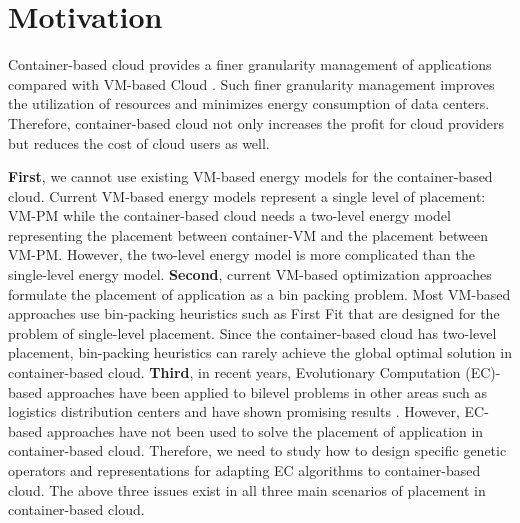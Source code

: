 \newpage

\section{Motivation}
\label{sec:motivation}

 Container-based cloud provides a finer granularity management of applications compared with VM-based Cloud \cite{:2017ff}. Such finer granularity management improves the utilization of resources and minimizes energy consumption of data centers. Therefore, container-based cloud not only increases the profit for cloud providers but reduces the cost of cloud users as well.

 \textbf{First}, we cannot use existing VM-based energy models for the container-based cloud. Current VM-based energy models represent a single level of placement: VM-PM while the container-based cloud needs a two-level energy model representing the placement between container-VM and the placement between VM-PM. However, the two-level energy model is more complicated than the single-level energy model. 
\textbf{Second}, current VM-based optimization approaches \cite{Beloglazov:2010dt, Liu:2013kl} formulate the placement of application as a bin packing problem. Most VM-based approaches use bin-packing heuristics such as First Fit \cite{Dosa:2013ie} that are designed for the problem of single-level placement. Since the container-based cloud has two-level placement,  bin-packing heuristics can rarely achieve the global optimal solution in container-based cloud. \textbf{Third}, in recent years, Evolutionary Computation (EC)-based approaches have been applied to bilevel problems in other areas such as logistics distribution centers and have shown promising results \cite{Angelo:2013ee, Sinha:2017et, Deb:2010in}. However, EC-based approaches have not been used to solve the placement of application in container-based cloud. Therefore, we need to study how to design specific genetic operators and representations for adapting EC algorithms to container-based cloud.  The above three issues exist in all three main scenarios of placement in container-based cloud. 

